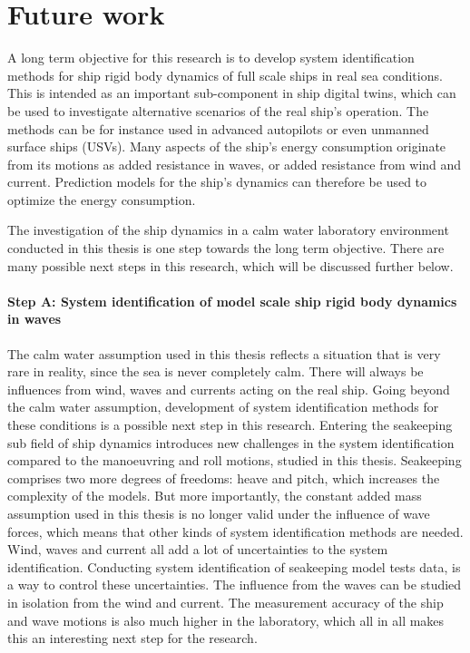 \chapter{Future work\label{ch:future_work}}
A long term objective for this research is to develop system identification methods for ship rigid body dynamics of full scale ships in real sea conditions. This is intended as an important sub-component in ship digital twins, which can be used to investigate alternative scenarios of the real ship's operation. The methods can be for instance used in advanced autopilots or even unmanned surface ships (USVs). Many aspects of the ship's energy consumption originate from its motions as added resistance in waves, or added resistance from wind and current. Prediction models for the ship's dynamics can therefore be used to optimize the energy consumption.

The investigation of the ship dynamics in a calm water laboratory environment conducted in this thesis is one step towards the long term objective. There are many possible next steps in this research, which will be discussed further below.  

\subsubsection*{Step A: System identification of model scale ship rigid body dynamics in waves}
The calm water assumption used in this thesis reflects a situation that is very rare in reality, since the sea is never completely calm. There will always be influences from wind, waves and currents acting on the real ship. Going beyond the calm water assumption, development of system identification methods for these conditions is a possible next step in this research. Entering the seakeeping sub field of ship dynamics introduces new challenges in the system identification compared to the manoeuvring and roll motions, studied in this thesis. Seakeeping comprises two more degrees of freedoms: heave and pitch, which increases the complexity of the models. But more importantly, the constant added mass assumption used in this thesis is no longer valid under the influence of wave forces, which means that other kinds of system identification methods are needed. Wind, waves and current all add a lot of uncertainties to the system identification. Conducting system identification of seakeeping model tests data, is a way to control these uncertainties. The influence from the waves can be studied in isolation from the wind and current. The measurement accuracy of the ship and wave motions is also much higher in the laboratory, which all in all makes this an interesting next step for the research.  


